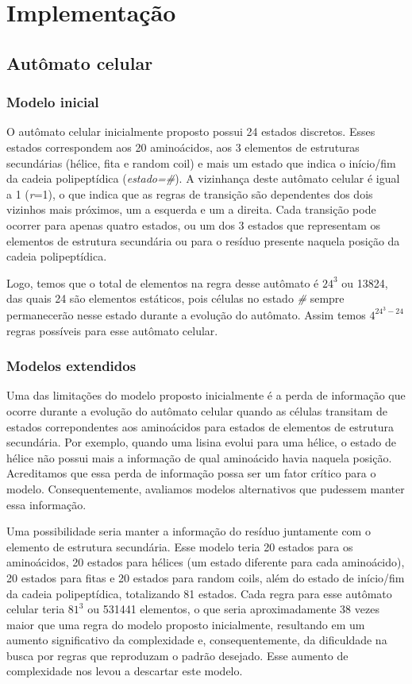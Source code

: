 \chapter{Implementação}

\section{Autômato celular}

\subsection{Modelo inicial}

O autômato celular inicialmente proposto possui 24 estados discretos. Esses estados correspondem aos 20 aminoácidos, aos 3 elementos de estruturas secundárias (hélice, fita e random coil) e mais um estado que indica o início/fim da cadeia polipeptídica (\textit{estado=\#}). A vizinhança deste autômato celular é igual a 1 (\textit{r}=1),  o que indica que as regras de transição são dependentes dos dois vizinhos mais próximos, um a esquerda e um a direita. Cada transição pode ocorrer para apenas quatro estados, ou um dos 3 estados que representam os elementos de estrutura secundária ou para o resíduo presente naquela posição da cadeia polipeptídica.

Logo, temos que o total de elementos na regra desse autômato é $24^3$ ou 13824, das quais 24 são elementos estáticos, pois células no estado \textit{\#} sempre permanecerão nesse estado durante a evolução do autômato. Assim temos $4^{24^3-24}$ regras possíveis para esse autômato celular.

\subsection{Modelos extendidos}

Uma das limitações do modelo proposto inicialmente é a perda de informação que ocorre durante a evolução do autômato celular quando as células transitam de estados correpondentes aos aminoácidos para estados de elementos de estrutura secundária. Por exemplo, quando uma lisina evolui para uma hélice, o estado de hélice não possui mais a informação de qual aminoácido havia naquela posição. Acreditamos que essa perda de informação possa ser um fator crítico para o modelo. Consequentemente, avaliamos modelos alternativos que pudessem manter essa informação. 

Uma possibilidade seria manter a informação do resíduo juntamente com o elemento de estrutura secundária. Esse modelo teria 20 estados para os aminoácidos, 20 estados para hélices (um estado diferente para cada aminoácido), 20 estados para fitas e 20 estados para random coils, além do estado de início/fim da cadeia polipeptídica, totalizando 81 estados. Cada regra para esse autômato celular teria $81^3$  ou 531441 elementos, o que seria aproximadamente 38 vezes maior que uma regra do modelo proposto inicialmente, resultando em um aumento significativo da complexidade e, consequentemente, da dificuldade na busca por regras que reproduzam o padrão desejado. Esse aumento de complexidade nos levou a descartar este modelo.

